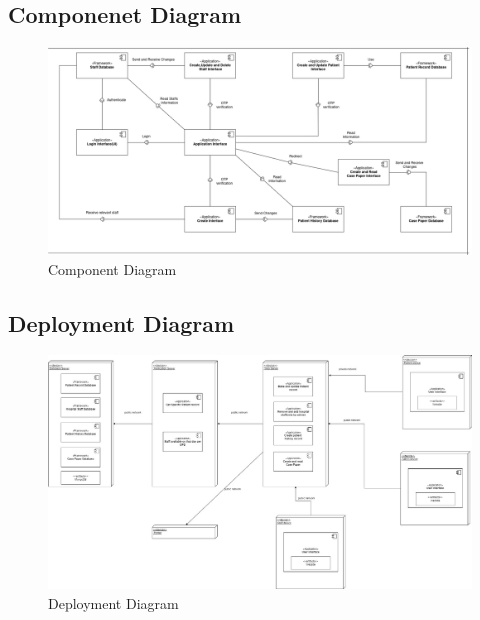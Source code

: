\subsection{Componenet Diagram}
\begin{figure}[h!]
    \centering
    \includegraphics[width=1.1\textwidth]{Component_diag.png}
    \caption{Component Diagram}
\end{figure}
\subsection{Deployment Diagram}
\begin{figure}[h!]
    \centering
    \includegraphics[width=1.1\textwidth]{deployment.jpeg}
    \caption{Deployment Diagram}
\end{figure}
